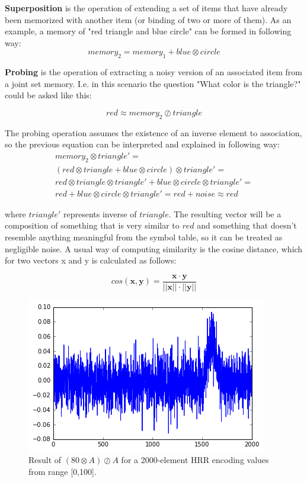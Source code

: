 \documentclass[conference]{IEEEtran}
\begin{document}
	\textbf{Superposition} is the operation of extending a set of items that have already been memorized with another item (or binding of two or more of them).
As an example, a memory of "red triangle and blue circle" can be formed in following way:
	\begin{equation}
	memory_2 = memory_1 + blue \otimes circle
	\end{equation}
	
	\textbf{Probing} is the operation of extracting a noisy version of an associated item from a joint set memory.
I.e. in this scenario the question "What color is the triangle?" could be asked like this:
	
	\begin{equation}
	red \approx memory_2 \oslash triangle
	\end{equation}
	
	
	The probing operation assumes the existence of an inverse element to association, so the previous equation can be interpreted and explained in following way:
	\begin{multline}
	memory_2 \otimes triangle'=\\
	(red \otimes triangle + blue \otimes circle) \otimes triangle'=\\
	red \otimes triangle  \otimes triangle' + blue \otimes circle \otimes triangle' =\\
	red + blue \otimes circle \otimes triangle'  = red + noise
	\approx red
	\end{multline}
	
	where $triangle'$ represents inverse of $triangle$.
The resulting vector will be a composition of something that is very similar to $red$ and something that doesn't resemble anything meaningful from the symbol table, so it can be treated as negligible noise.	A usual way of computing similarity is the cosine distance, which for two vectors \pmb x and \pmb y is calculated as follows:
	
	\begin{equation}
cos(\pmb x, \pmb y) = \frac {\pmb x \cdot \pmb y}{||\pmb x|| \cdot ||\pmb y||}
	\end{equation} 
	
	
	\begin{figure}
		\center
		\includegraphics[width=0.9\columnwidth]{img/scalar-probe.png}
		\caption{Result of $(80 \otimes A) \oslash A$ for a 2000-element HRR encoding values from range [0,100].}
	\end{figure}
	
\end{document}
